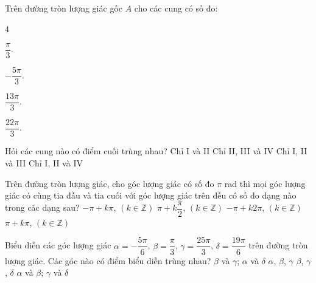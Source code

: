 \begin{ex}%
	Trên đường tròn lượng giác  gốc $A$ cho các cung có số đo:
	\begin{enumEX}[I.]{4}
		 \item $\dfrac{\pi}{3}$.
		\item $-\dfrac{5\pi}{3}$. 
		 \item $\dfrac{13\pi}{3}$.
		 \item $\dfrac{22\pi}{3}$.
	\end{enumEX}
	Hỏi các cung nào  có điểm cuối trùng nhau?
	 \choice
		{Chỉ I  và II}
		{Chỉ II, III và  IV}
		{\True Chỉ I,  II và III}
		{Chỉ I, II  và IV}
\end{ex}

\begin{ex}%
	Trên đường tròn lượng giác, cho góc lượng giác có số đo $\pi$ rad thì mọi góc lượng giác có cùng tia đầu và tia cuối với góc lượng giác trên đều có số đo dạng nào trong các dạng  sau?
	\choice 
		{$-\pi+k \pi$, $(k  \in \mathbb{Z})$}
		{$\pi+k \dfrac{\pi}{2}$, $(k \in \mathbb{Z})$} 
		 {\True $-\pi+k 2\pi$, $(k \in \mathbb{Z})$}
		{$\pi+k \pi$,  $(k \in \mathbb{Z})$}
\end{ex}

\begin{ex}%
	Biểu diễn các góc lượng giác $\alpha=-\dfrac{5\pi}{6}$, $\beta=\dfrac{\pi}{3}$, $\gamma=\dfrac{25\pi}{3}$, $\delta=\dfrac{19\pi}{6}$ trên đường tròn lượng giác. Các góc nào có  điểm biểu diễn trùng nhau?
	 \choice
		{\True $\beta$ và $\gamma$; $\alpha$  và $\delta$}
		 {$\alpha$, $\beta$, $\gamma$}
		{$\beta$,  $\gamma$, $\delta$}
		{$\alpha$  và $\beta$; $\gamma$ và $\delta$}
\end{ex}

